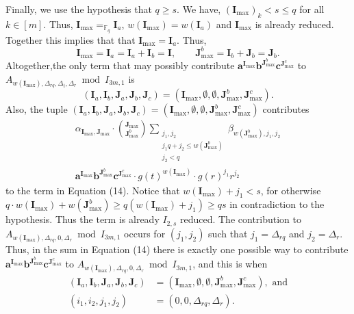 \documentclass[10pt,a4paper]{article}
\begin{document}
Finally, we use the hypothesis that $q\geq s$. We have, $(\boldsymbol I_{\max})_k<s\leq q$ for all $k\in[m]$. Thus, $\boldsymbol I_{\max}=_{\mathbb F_q}\boldsymbol I_a$, $w(\boldsymbol I_{\max})=w(\boldsymbol I_a)$ and $\boldsymbol I_{\max}$ is already reduced. Together this implies that that $\boldsymbol I_{\max}=\boldsymbol I_a$.
Thus,
\[\boldsymbol I_{\max}=\boldsymbol I_a=\boldsymbol I_a+\boldsymbol I_b=\boldsymbol I,\qquad\boldsymbol J_{\max}^b=\boldsymbol I_b+\boldsymbol J_b=\boldsymbol J_b.\]
Altogether,the only term that may possibly contribute $\boldsymbol a^{\boldsymbol I_{\max}}\boldsymbol b^{\boldsymbol J_{\max}^b}\boldsymbol c^{\boldsymbol J_{\max}^c}$ to $A_{w(\boldsymbol I_{\max}),\Delta_{rq},\Delta_t,\Delta_r}\bmod I_{3m,1}$ is
\[(\boldsymbol I_a,\boldsymbol I_b,\boldsymbol J_a,\boldsymbol J_b,\boldsymbol J_c)=(\boldsymbol I_{\max},\emptyset,\emptyset,\boldsymbol J_{\max}^b,\boldsymbol J_{\max}^c).\]
Also, the tuple $(\boldsymbol I_a,\boldsymbol I_b,\boldsymbol J_a,\boldsymbol J_b,\boldsymbol J_c)=(\boldsymbol I_{\max},\emptyset,\emptyset,\boldsymbol J_{\max}^b,\boldsymbol J_{\max}^c)$ contributes
\begin{multline*}
\alpha_{\boldsymbol I_{\max},\boldsymbol J_{\max}}\cdot\binom{\boldsymbol J_{\max}}{\boldsymbol J_{\max}^b}\sum_{\substack{j_1,j_2\\j_1q+j_2\leq w(\boldsymbol J_{\max}^b)\\j_2<q}}\beta_{w(\boldsymbol J_{\max}^b),j_1,j_2}\\
\boldsymbol a^{\boldsymbol I_{\max}}\boldsymbol b^{\boldsymbol J_{\max}^b}\boldsymbol c^{\boldsymbol J_{\max}^c}\cdot g(t)^{w(\boldsymbol I_{\max})}\cdot g(r)^{j_1}r^{j_2}
\end{multline*}
to the term in Equation (14).
Notice that $w(\boldsymbol I_{\max})+j_1<s$, for otherwise $q\cdot w(\boldsymbol I_{\max})+w(\boldsymbol J_{\max}^b)\geq q(w(\boldsymbol I_{\max})+j_1)\geq qs$ in contradiction to the hypothesis. Thus the term is already $I_{2,s}$ reduced. The contribution to $A_{w(\boldsymbol I_{\max}),\Delta_{rq},0,\Delta_r}\bmod I_{3m,1}$ occurs for $(j_1,j_2)$ such that $j_1=\Delta_{rq}$ and $j_2=\Delta_r$. Thus, in the sum in Equation (14) there is exactly one possible way to contribute $\boldsymbol a^{\boldsymbol I_{\max}}\boldsymbol b^{\boldsymbol J_{\max}^b}\boldsymbol c^{\boldsymbol J_{\max}^c}$ to $A_{w(\boldsymbol I_{\max}),\Delta_{rq},0,\Delta_r}\bmod I_{3m,1}$, and this is when
\begin{align*}
(\boldsymbol I_a,\boldsymbol I_b,\boldsymbol J_a,\boldsymbol J_b,\boldsymbol J_c)&=(\boldsymbol I_{\max},\emptyset,\emptyset,\boldsymbol J_{\max}^b,\boldsymbol J_{\max}^c),\text{ and}\\
(i_1,i_2,j_1,j_2)&=(0,0,\Delta_{rq},\Delta_r).
\end{align*}
\end{document}
